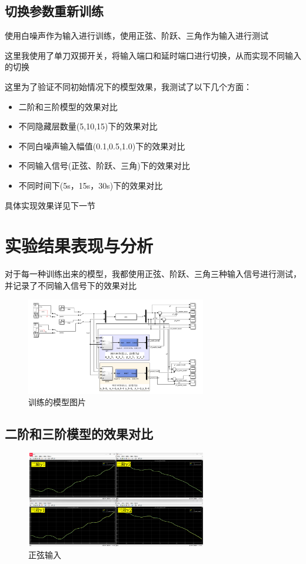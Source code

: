 \documentclass[12pt,a4paper,UTF8]{article}
\begin{document}
\subsection{切换参数重新训练}

使用白噪声作为输入进行训练，使用正弦、阶跃、三角作为输入进行测试

这里我使用了单刀双掷开关，将输入端口和延时端口进行切换，从而实现不同输入的切换

这里为了验证不同初始情况下的模型效果，我测试了以下几个方面：

\begin{itemize}
    \item 二阶和三阶模型的效果对比
    \item 不同隐藏层数量(5,10,15)下的效果对比
    \item 不同白噪声输入幅值(0.1,0.5,1.0)下的效果对比
    \item 不同输入信号(正弦、阶跃、三角)下的效果对比
    \item 不同时间下(5s，15s，30s)下的效果对比
\end{itemize}


具体实现效果详见下一节


\clearpage
\section{实验结果表现与分析}
对于每一种训练出来的模型，我都使用正弦、阶跃、三角三种输入信号进行测试，并记录了不同输入信号下的效果对比


\begin{figure}[htbp] \centering \includegraphics[width=0.7\textwidth]{figures/2024-12-24-00-21-09.png} \caption{训练的模型图片} \label{  }\end{figure}
\subsection{二阶和三阶模型的效果对比}
\begin{figure}[htbp] \centering \includegraphics[width=0.7\textwidth]{figures/2024-12-24-00-24-40.png} \caption{正弦输入} \label{  }\end{figure}
\end{document}
